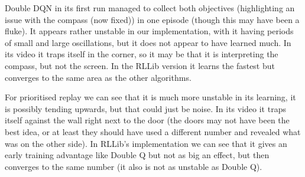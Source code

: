 \documentclass[a4pape, 11pt, english]{article}
\begin{document}

Double DQN in its first run managed to collect both objectives (highlighting an issue with the compass (now fixed)) in one episode (though this may have been a fluke). It appears rather unstable in our implementation, with it having periods of small and large oscillations, but it does not appear to have learned much. In its video it traps itself in the corner, so it may be that it is interpreting the compass, but not the screen. In the RLLib version it learns the fastest but converges to the same area as the other algorithms.

For prioritised replay we can see that it is much more unstable in its learning, it is possibly tending upwards, but that could just be noise. In its video it traps itself against the wall right next to the door (the doors may not have been the best idea, or at least they should have used a different number and revealed what was on the other side). In RLLib's implementation we can see that it gives an early training advantage like Double Q but not as big an effect, but then converges  to the same number (it also is not as unstable as Double Q).
\end{document}
